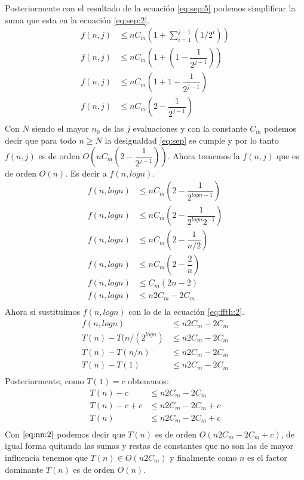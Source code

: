 \documentclass[12pt]{article}
\begin{document}
Posteriormente con el resultado de la ecuación \ref{eq:sep:5} podemos simplificar la suma que esta en la ecuación \ref{eq:sep:2}.
\begin{equation}\label{eq:sep:6}
\begin{split}
f(n,j) & \leq nC_m (1 + \sum_{i=1}^{j-1}{(1/2^{i})}) \\
f(n,j) & \leq nC_m (1 + (1 - \dfrac{1}{2^{j-1}} )) \\
f(n,j) & \leq nC_m (1 + 1 - \dfrac{1}{2^{j-1}} ) \\
f(n,j) & \leq nC_m (2 - \dfrac{1}{2^{j-1}} ) \\
\end{split}
\end{equation}
Con $N$ siendo el mayor $n_0$ de las $j$ evaluaciones y con la constante $C_m$ podemos decir que para todo $n\geq N$ la desigualdad \eqref{eq:sep} se cumple y por lo tanto $f(n,j)$ es de orden $O(nC_m (2 - \dfrac{1}{2^{j-1}} ))$.
Ahora tomemos la $f(n,j)$ que es de orden $O(n)$. Es decir a $f(n,logn)$.
\begin{equation}\label{eq:oct:2}
\begin{split}
f(n,logn) & \leq nC_m (2 - \dfrac{1}{2^{logn-1}} ) \\
f(n,logn) &  \leq nC_m (2 - \dfrac{1}{2^{logn} 2^{-1}} ) \\
f(n,logn) & \leq nC_m (2 - \dfrac{1}{n/2} ) \\
f(n,logn) & \leq nC_m (2 - \dfrac{2}{n} ) \\
f(n,logn) & \leq C_m (2n - 2) \\
f(n,logn) & \leq n2C_m - 2C_m \\
\end{split}
\end{equation}
Ahora si sustituimos $f(n,logn)$ con lo de la ecuación \ref{eq:ffth:2}.
\begin{equation}\label{eq:oct:3}
\begin{split}
f(n,logn)  & \leq n2C_m - 2C_m \\
T(n)-T(n/(2^{logn}) & \leq n2C_m - 2C_m \\
T(n)-T(n/n)  & \leq n2C_m - 2C_m \\
T(n)-T(1) & \leq n2C_m - 2C_m \\
\end{split}
\end{equation}
Posteriormente, como $T(1)=c$ obtenemos:
\begin{equation}\label{eq:nn:2}
\begin{split}
T(n)-c  & \leq n2C_m - 2C_m \\
T(n)-c+c & \leq n2C_m - 2C_m + c\\
T(n) & \leq n2C_m - 2C_m + c\\
\end{split}
\end{equation}
Con $\eqref{eq:nn:2}$ podemos decir que $T(n)$ es de orden $O(n2C_m - 2C_m + c)$, de igual forma quitando las sumas y restas de constantes que no son las de mayor influencia tenemos que $T(n) \in O(n2C_m)$ y finalmente como $n$ es el factor dominante $T(n)$ es de orden $O(n)$.\\
\pagebreak
\end{document}
